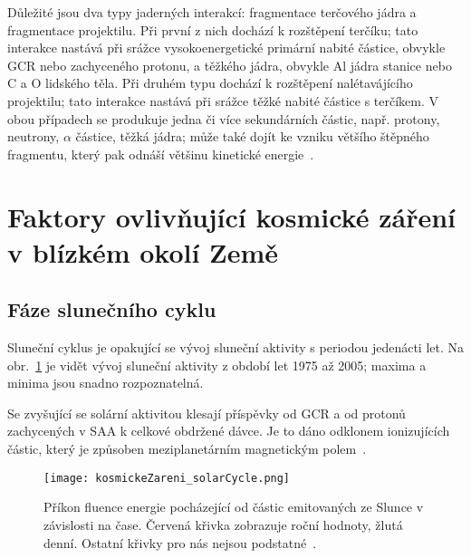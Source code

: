 Důležité jsou dva typy jaderných interakcí: fragmentace terčového jádra a fragmentace projektilu. Při první z nich dochází k rozštěpení terčíku; tato interakce nastává při srážce vysokoenergetické primární nabité částice, obvykle GCR nebo zachyceného protonu, a těžkého jádra, obvykle Al jádra stanice nebo C a O lidského těla. Při druhém typu dochází k rozštěpení nalétavájícího projektilu; tato interakce nastává při srážce těžké nabité částice s terčíkem. V obou případech se produkuje jedna či více sekundárních částic, např. protony, neutrony, $\alpha$ částice, těžká jádra; může také dojít ke vzniku většího štěpného fragmentu, který pak odnáší většinu kinetické energie~\cite{benton}. 
 


\section{Faktory ovlivňující kosmické záření v blízkém okolí Země}
\subsection{Fáze slunečního cyklu}\label{sec:kosmickeZareni_solar}
Sluneční cyklus je opakující se vývoj sluneční aktivity s periodou jedenácti let. Na obr.~\ref{fig:kosmickeZareni_solarCycle} je vidět vývoj sluneční aktivity z období let 1975 až 2005; maxima a minima jsou snadno rozpoznatelná.

Se zvyšující se solární aktivitou klesají příspěvky od GCR a od protonů zachycených v SAA k celkové obdržené dávce. Je to dáno odklonem ionizujících částic, který je způsoben meziplanetárním magnetickým polem~\cite{dosis}.
\begin{figure}[h]
  \centering
  \texttt{[image: kosmickeZareni\_solarCycle.png]}
  \caption{Příkon fluence energie pocházející od částic emitovaných ze Slunce v závislosti na čase. Červená křivka zobrazuje roční hodnoty, žlutá denní. Ostatní křivky pro nás nejsou podstatné~\cite{solarCycle_wiki}.}
  \label{fig:kosmickeZareni_solarCycle}
\end{figure}
